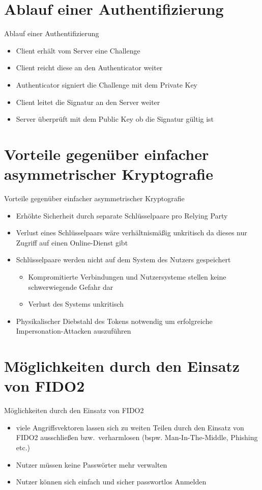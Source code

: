 \documentclass{beamer}
\begin{document}
\section{Ablauf einer Authentifizierung}
\begin{frame}{Ablauf einer Authentifizierung}
	\begin{itemize}
		\item Client erhält vom Server eine Challenge
		\item Client reicht diese an den Authenticator weiter
		\item Authenticator signiert die Challenge mit dem Private Key
		\item Client leitet die Signatur an den Server weiter
		\item Server überprüft mit dem Public Key ob die Signatur gültig ist
	\end{itemize}
\end{frame}

\section{Vorteile gegenüber einfacher asymmetrischer Kryptografie}
\begin{frame}{Vorteile gegenüber einfacher asymmetrischer Kryptografie}
	\begin{itemize}
		\item Erhöhte Sicherheit durch separate Schlüsselpaare pro Relying Party
		\item Verlust eines Schlüsselpaars wäre verhältnismäßig unkritisch da
			dieses nur Zugriff auf einen Online-Dienst gibt
		\item Schlüsselpaare werden nicht auf dem System des Nutzers gespeichert
			\begin{itemize}
				\item Kompromitierte Verbindungen und Nutzersysteme stellen keine schwerwiegende Gefahr dar
				\item Verlust des Systems unkritisch
			\end{itemize}
		\item Physikalischer Diebstahl des Tokens notwendig um erfolgreiche
			Impersonation-Attacken auszuführen
	\end{itemize}
\end{frame}


\section{Möglichkeiten durch den Einsatz von FIDO2}
\begin{frame}{Möglichkeiten durch den Einsatz von FIDO2}
	\begin{itemize}
		\item viele Angriffsvektoren lassen sich zu weiten Teilen durch den
			Einsatz von FIDO2 ausschließen bzw.\ verharmlosen (bspw.
			Man-In-The-Middle, Phishing etc.)
		\item Nutzer müssen keine Passwörter mehr verwalten
		\item Nutzer können sich einfach und sicher passwortlos Anmelden
	\end{itemize}
\end{frame}
\end{document}
